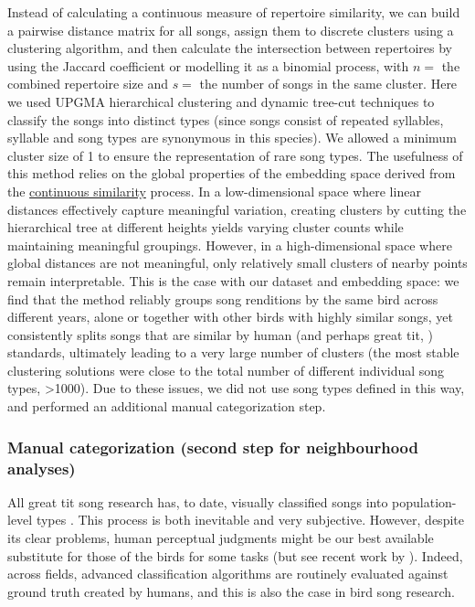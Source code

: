 Instead of calculating a continuous measure of repertoire similarity, we can build a pairwise distance matrix for all songs, assign them to discrete clusters using a clustering algorithm, and then calculate the intersection between repertoires by using the Jaccard coefficient or modelling it as a binomial process, with $n = $ the combined repertoire size and $s = $ the number of songs in the same cluster. Here we used UPGMA hierarchical clustering and dynamic tree-cut techniques to classify the songs into distinct types (since songs consist of repeated syllables, syllable and song types are synonymous in this species). We allowed a minimum cluster size of 1 to ensure the representation of rare song types. The usefulness of this method relies on the global properties of the embedding space derived from the \hyperref[sc:song-similarity]{continuous similarity} process. In a low-dimensional space where linear distances effectively capture meaningful variation, creating clusters by cutting the hierarchical tree at different heights yields varying cluster counts while maintaining meaningful groupings. However, in a high-dimensional space where global distances are not meaningful, only relatively small clusters of nearby points remain interpretable. This is the case with our dataset and embedding space: we find that the method reliably groups song renditions by the same bird across different years, alone or together with other birds with highly similar songs, yet consistently splits songs that are similar by human (and perhaps great tit, \cite{falls1982}) standards, ultimately leading to a very large number of clusters (the most stable clustering solutions were close to the total number of different individual song types, >1000). Due to these issues, we did not use song types defined in this way, and performed an additional manual categorization step.

\subsubsection{Manual categorization (second step for neighbourhood analyses)}
\label{sc:manual-categorization}

All great tit song research has, to date, visually classified songs into population-level types \autocite{baker1987, falls1982, fayet2014, hutfluss2022, mcgregor1982, mcgregor1981, mcgregor1982b}. This process is both inevitable and very subjective. However, despite its clear problems, human perceptual judgments might be our best available substitute for those of the birds for some tasks (but see recent work by \cite{morfi2021, zandberg2022}). Indeed, across fields, advanced classification algorithms are routinely evaluated against ground truth created by humans, and this is also the case in bird song research.

